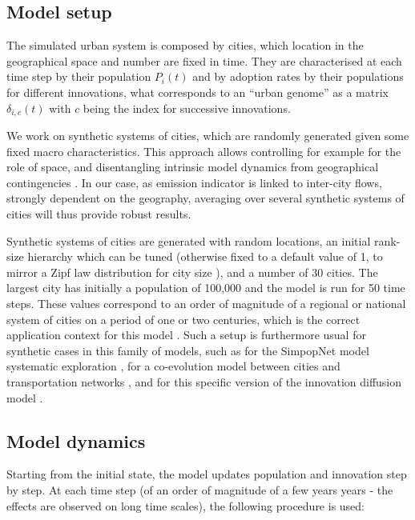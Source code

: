 \documentclass[final,5p,times,twocolumn,authoryear]{elsarticle}
\begin{document}
\subsection{Model setup}

The simulated urban system is composed by cities, which location in the geographical space and number are fixed in time. They are characterised at each time step by their population $P_i (t)$ and by adoption rates by their populations for different innovations, what corresponds to an ``urban genome'' as a matrix $\delta_{i,c} (t)$ with $c$ being the index for successive innovations.

We work on synthetic systems of cities, which are randomly generated given some fixed macro characteristics. This approach allows controlling for example for the role of space, and disentangling intrinsic model dynamics from geographical contingencies \citep{raimbault2019space}. In our case, as emission indicator is linked to inter-city flows, strongly dependent on the geography, averaging over several synthetic systems of cities will thus provide robust results.

Synthetic systems of cities are generated with random locations, an initial rank-size hierarchy which can be tuned (otherwise fixed to a default value of 1, to mirror a Zipf law distribution for city size \citep{cottineau2017metazipf}), and a number of 30 cities. The largest city has initially a population of 100,000 and the model is run for 50 time steps. These values correspond to an order of magnitude of a regional or national system of cities on a period of one or two centuries, which is the correct application context for this model \citep{favaro2011gibrat}. Such a setup is furthermore usual for synthetic cases in this family of models, such as for the SimpopNet model systematic exploration \citep{raimbault2020unveiling}, for a co-evolution model between cities and transportation networks \citep{raimbault2021modeling}, and for this specific version of the innovation diffusion model \citep{raimbault2020model}.


\subsection{Model dynamics}

Starting from the initial state, the model updates population and innovation step by step. At each time step (of an order of magnitude of a few years years - the effects are observed on long time scales), the following procedure is used:
\end{document}
